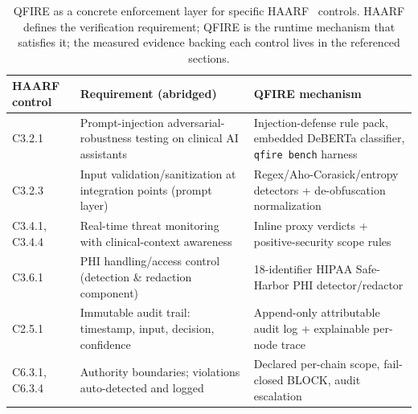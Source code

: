 \documentclass[11pt]{article}
\begin{document}
\begin{table}[htb]
\centering\small
\begin{tabular}{L{2.6cm}L{5.4cm}L{4.6cm}}
\toprule
HAARF control & Requirement (abridged) & QFIRE mechanism \\
\midrule
C3.2.1 & Prompt-injection adversarial-robustness testing on clinical AI assistants & Injection-defense rule pack, embedded DeBERTa classifier, \texttt{qfire bench} harness \\
C3.2.3 & Input validation/sanitization at integration points (prompt layer) & Regex/Aho-Corasick/entropy detectors + de-obfuscation normalization \\
C3.4.1,\,C3.4.4 & Real-time threat monitoring with clinical-context awareness & Inline proxy verdicts + positive-security scope rules \\
C3.6.1 & PHI handling/access control (detection \& redaction component) & 18-identifier HIPAA Safe-Harbor PHI detector/redactor \\
C2.5.1 & Immutable audit trail: timestamp, input, decision, confidence & Append-only attributable audit log + explainable per-node trace \\
C6.3.1,\,C6.3.4 & Authority boundaries; violations auto-detected and logged & Declared per-chain scope, fail-closed BLOCK, audit escalation \\
\bottomrule
\end{tabular}
\caption{QFIRE as a concrete enforcement layer for specific HAARF~\cite{schwoebel2026haarf}
controls. HAARF defines the verification requirement; QFIRE is the runtime
mechanism that satisfies it; the measured evidence backing each control lives in the referenced sections.}
\label{tab:haarf}
\end{table}
\end{document}
